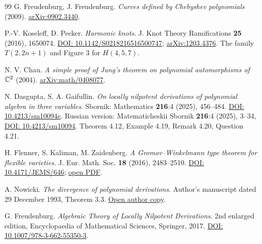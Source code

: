 \begin{thebibliography}{99}
 G. Freudenburg, J. Freudenburg.
\emph{Curves defined by Chebyshev polynomials} (2009).
\href{https://arxiv.org/abs/0902.3440}{arXiv:0902.3440}.

 P.-V. Koseleff, D. Pecker.
\emph{Harmonic knots}.
J. Knot Theory Ramifications \textbf{25} (2016), 1650074.
\href{https://doi.org/10.1142/S0218216516500747}{DOI: 10.1142/S0218216516500747};
\href{https://arxiv.org/abs/1203.4376}{arXiv:1203.4376}.
The family $T(2,2n+1)$ and Figure 3 for $H(4,5,7)$.

 N. V. Chau.
\emph{A simple proof of Jung's theorem on polynomial automorphisms
of ${\mathbb{C}}^2$} (2004).
\href{https://arxiv.org/abs/math/0408077}{arXiv:math/0408077}.

 N. Dasgupta, S. A. Gaifullin.
\emph{On locally nilpotent derivations of polynomial algebra in three
variables}. Sbornik: Mathematics \textbf{216}:4 (2025), 456--484.
\href{https://doi.org/10.4213/sm10094e}{DOI: 10.4213/sm10094e}.
Russian version: Matematicheskii Sbornik \textbf{216}:4 (2025), 3--34,
\href{https://doi.org/10.4213/sm10094}{DOI: 10.4213/sm10094}.
Theorem 4.12, Example 4.19, Remark 4.20, Question 4.21.

 H. Flenner, S. Kaliman, M. Zaidenberg.
\emph{A Gromov--Winkelmann type theorem for flexible varieties}.
J. Eur. Math. Soc. \textbf{18} (2016), 2483--2510.
\href{https://doi.org/10.4171/JEMS/646}{DOI: 10.4171/JEMS/646};
\href{https://ems.press/content/serial-article-files/32154}{open PDF}.

 A. Nowicki.
\emph{The divergence of polynomial derivations}.
Author's manuscript dated 29 December 1993, Theorem 3.3.
\href{https://www.researchgate.net/publication/242147525_The_divergence_of_polynomial_derivations}{Open author copy}.

 G. Freudenburg.
\emph{Algebraic Theory of Locally Nilpotent Derivations}.
2nd enlarged edition, Encyclopaedia of Mathematical Sciences,
Springer, 2017.
\href{https://doi.org/10.1007/978-3-662-55350-3}{DOI: 10.1007/978-3-662-55350-3}.
\end{thebibliography}
